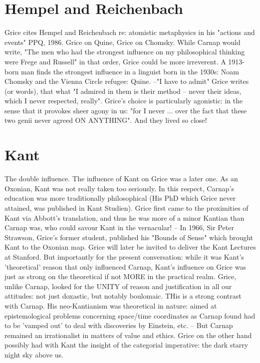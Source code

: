 \documentclass[10pt,titlepage]{book}
\begin{document}
{\section{Hempel and Reichenbach}

Grice cites Hempel and Reichenbach re: 
atomistic  metaphysics in his "actions and events" PPQ, 1986.  
Grice  on Quine, Grice on Chomsky. While  Carnap would write, "The men who 
had the strongest  influence on my  philosophical thinking were Frege and 
Russell" in that order,  Grice could  be more irreverent. A 1913-born man 
finds the strongest influence in  a  linguist born in the 1930s: Noam Chomsky 
and the Vienna Circle refugee:  Quine.  --"I have to admit" Grice writes (or 
words), that what "I admired  in them is  their method -- never their ideas, 
which I never respected,  really". Grice's choice is particularly agonistic: 
in the sense that it provokes  sheer agony in  us: "for I never ... over 
the fact that these two genii  never agreed ON  ANYTHING". And they lived so 
close!

\section{Kant}

The  double influence.
The influence of Kant on Grice was a 
later one. As an Oxonian,  Kant was not really taken too seriously. In this 
respect, Carnap's education was  more traditionally philosophical (His PhD 
which Grice never attained, was  published in Kant Studien). Grice first came 
to the proximities of Kant via  Abbott's translation, and thus he was more 
of a minor Kantian than Carnap was,  who could savour Kant in the 
vernacular! -- In 1966, Sir Peter Strawson, Grice's  former student, published his 
"Bounds of Sense" which brought Kant to the  Oxonian map. Grice will later be 
invited to deliver the Kant Lectures at  Stanford. But  importantly for the 
present conversation: while it was Kant's 'theoretical'  reason that only 
influenced Carnap, Kant's influence on Grice was just as strong  on the 
theoretical if not MORE in the practical realm. Grice, unlike  Carnap, looked for 
the UNITY of reason and justification in all  our attitudes: not just 
doxastic, but notably boulomaic. THis is a strong  contrast with Carnap. His 
neo-Kantianism was theoretical in nature: aimed at  epistemological problems 
concerning space/time coordinates as Carnap  found had to be 'vamped out' to deal 
with discoveries by Einstein, etc.  -- But Carnap remained an irrationalist 
in matters of value and  ethics. Grice on the other hand possibly had with 
Kant the insight of the  categorial imperative: the dark starry night sky 
above us. 

}
\end{document}
